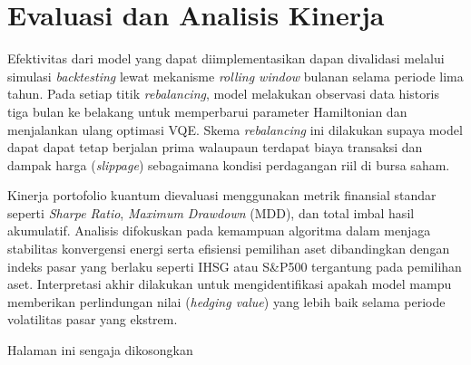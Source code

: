 \section{Evaluasi dan Analisis Kinerja}
Efektivitas dari model yang dapat diimplementasikan dapan divalidasi melalui simulasi \textit{backtesting} lewat mekanisme \textit{rolling window} bulanan selama periode lima tahun. Pada setiap titik \textit{rebalancing}, model melakukan observasi data historis tiga bulan ke belakang untuk memperbarui parameter Hamiltonian dan menjalankan ulang optimasi VQE. Skema \textit{rebalancing} ini dilakukan supaya model dapat dapat tetap berjalan prima walaupaun terdapat biaya transaksi dan dampak harga (\textit{slippage}) sebagaimana kondisi perdagangan riil di bursa saham.

Kinerja portofolio kuantum dievaluasi menggunakan metrik finansial standar seperti \textit{Sharpe Ratio}, \textit{Maximum Drawdown} (MDD), dan total imbal hasil akumulatif. Analisis difokuskan pada kemampuan algoritma dalam menjaga stabilitas konvergensi energi serta efisiensi pemilihan aset dibandingkan dengan indeks pasar yang berlaku seperti IHSG atau S\&P500 tergantung pada pemilihan aset. Interpretasi akhir dilakukan untuk mengidentifikasi apakah model mampu memberikan perlindungan nilai (\textit{hedging value}) yang lebih baik selama periode volatilitas pasar yang ekstrem.

\newpage
\thispagestyle{empty}
\vspace*{\fill}
    \begin{center}
	Halaman ini sengaja dikosongkan
    \end{center}
\vspace*{\fill}
\pagebreak
